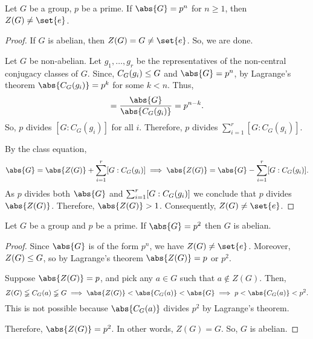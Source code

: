 \documentclass[11pt]{penrose}
\begin{document}
\begin{nthm}
    Let $G$ be a group, $p$ be a prime. If $\abs{G} = p^{n}$ for $n \geq 1$, then $Z(G) \neq \set{e}$.
\end{nthm}
\begin{proof}
    If $G$ is abelian, then $Z(G) = G \neq \set{e}$. So, we are done.

    Let $G$ be non-abelian. Let $g_{1}, \dots, g_{r}$ be the representatives of the non-central conjugacy classes of $G$. Since, $C_{G}(g_{i}) \mathrel{\leq} G$ and $\abs{G} = p^{n}$, by Lagrange's theorem $\abs{C_{G}(g_{i})} = p^{k}$ for some $k < n$. Thus,
    \begin{equation*}
        [G : C_{G}(g_{i})] = \frac{\abs{G}}{\abs{C_{G}(g_{i})}} = p^{n-k}.
    \end{equation*}
    So, $p$ divides $[G : C_{G}(g_{i})]$ for all $i$. Therefore, $p$ divides $\sum_{i=1}^{r} [G : C_{G}(g_{i})]$.

    By the class equation,
    \begin{equation*}
        \abs{G} = \abs{Z(G)} + \sum_{i=1}^{r} \comm{G : C_{G}(g_{i})}
        \implies
        \abs{Z(G)} = \abs{G} - \sum_{i=1}^{r} \comm{G : C_{G}(g_{i})}.
    \end{equation*}
    As $p$ divides both $\abs{G}$ and $\sum_{i=1}^{r} \lbrack G : C_{G}(g_{i})\rbrack$ we conclude that $p$ divides $\abs{Z(G)}$. Therefore, $\abs{Z(G)} > 1$. Consequently, $Z(G) \neq \set{e}$.
\end{proof}

\begin{ncor}
    Let $G$ be a group and $p$ be a prime. If $\abs{G} = p^{2}$ then $G$ is abelian.
\end{ncor}
\begin{proof}
    Since $\abs{G}$ is of the form $p^{n}$, we have $Z(G) \neq \set{e}$. Moreover, $Z(G) \mathrel{\leq} G$, so by Lagrange's theorem $\abs{Z(G)} = p$ or $p^{2}$.

    Suppose $\abs{Z(G)} = p$, and pick any $a \in G$ such that $a \notin Z(G)$. Then,
    \begin{equation*}
        Z(G) \lneqq C_{G}(a) \lneqq G
        \implies
        \abs{Z(G)} < \abs{C_{G}(a)} < \abs{G}
        \implies
        p < \abs{C_{G}(a)} < p^{2}.
    \end{equation*}
    This is not possible because $\abs{C_{G}(a)}$ divides $p^{2}$ by Lagrange's theorem.

    Therefore, $\abs{Z(G)} = p^{2}$. In other words, $Z(G) = G$. So, $G$ is abelian.
\end{proof}
\end{document}
